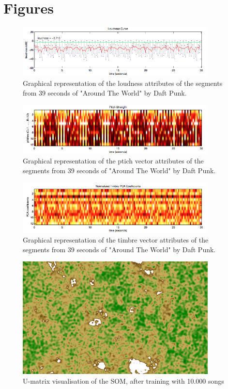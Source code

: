 \section{Figures} %
\label{sec:list_of_figures}

\begin{figure}[h]
    \centering
    \includegraphics[width=0.9\textwidth]{figures/loudness.jpg}
    \caption{Graphical representation of the loudness attributes of the segments from 39 seconds of "Around The World" by Daft Punk.}
    \label{fig:loudness}
\end{figure}

\begin{figure}[h]
    \centering
    \includegraphics[width=0.9\textwidth]{figures/pitch.jpg}
    \caption{Graphical representation of the ptich vector attributes of the segments from 39 seconds of "Around The World" by Daft Punk.}
    \label{fig:pitch}
\end{figure}

\begin{figure}[h]
    \centering
    \includegraphics[width=0.9\textwidth]{figures/timbre.jpg}
    \caption{Graphical representation of the timbre vector attributes of the segments from 39 seconds of "Around The World" by Daft Punk.}
    \label{fig:timbre}
\end{figure}

\newpage

\begin{figure}[h!]
    \centering
    \includegraphics[angle=90, width=0.9\textwidth]{figures/map.jpg}
    \caption{U-matrix visualisation of the SOM, after training with 10.000 songs}
    \label{fig:map}
\end{figure}
